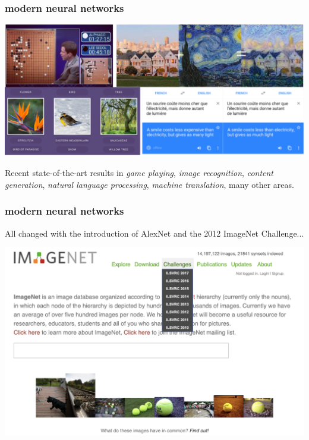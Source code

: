 \documentclass[handout,compress]{beamer}
\begin{document}
\begin{frame}
	\frametitle{modern neural networks}
	\begin{center}
		\includegraphics[width=.8\textwidth]{newstuff.png}
	\end{center}
Recent state-of-the-art results in \emph{game playing}, \emph{image recognition}, \emph{content generation}, \emph{natural language processing}, \emph{machine translation}, many other areas.  
\end{frame}

\begin{frame}
	\frametitle{modern neural networks}
	All changed with the introduction of AlexNet and the 2012 ImageNet Challenge...
	\begin{center}
		\includegraphics[width=.8\textwidth]{imagenet_page.png}
	\end{center}
\end{frame}
\end{document}
